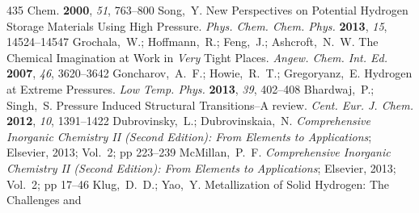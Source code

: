\documentclass[12pt,letterpaper,oneside]{article}
\begin{document}
\begin{mcitethebibliography}{435}
{  Chem.} \textbf{2000}, \emph{51}, 763--800\relax
\mciteBstWouldAddEndPuncttrue
\mciteSetBstMidEndSepPunct{\mcitedefaultmidpunct}
{\mcitedefaultendpunct}{\mcitedefaultseppunct}\relax
\EndOfBibitem
{}
Song,~Y. New Perspectives on Potential Hydrogen Storage Materials Using High
  Pressure. \emph{Phys. Chem. Chem. Phys.} \textbf{2013}, \emph{15},
  14524--14547\relax
\mciteBstWouldAddEndPuncttrue
\mciteSetBstMidEndSepPunct{\mcitedefaultmidpunct}
{\mcitedefaultendpunct}{\mcitedefaultseppunct}\relax
\EndOfBibitem
{}
Grochala,~W.; Hoffmann,~R.; Feng,~J.; Ashcroft,~N.~W. The Chemical Imagination
  at Work in \emph{Very} Tight Places. \emph{Angew. Chem. Int. Ed.}
  \textbf{2007}, \emph{46}, 3620--3642\relax
\mciteBstWouldAddEndPuncttrue
\mciteSetBstMidEndSepPunct{\mcitedefaultmidpunct}
{\mcitedefaultendpunct}{\mcitedefaultseppunct}\relax
\EndOfBibitem
{}
Goncharov,~A.~F.; Howie,~R.~T.; Gregoryanz,~E. Hydrogen at Extreme Pressures.
  \emph{Low Temp. Phys.} \textbf{2013}, \emph{39}, 402--408\relax
\mciteBstWouldAddEndPuncttrue
\mciteSetBstMidEndSepPunct{\mcitedefaultmidpunct}
{\mcitedefaultendpunct}{\mcitedefaultseppunct}\relax
\EndOfBibitem
{}
Bhardwaj,~P.; Singh,~S. Pressure Induced Structural Transitions--A review.
  \emph{Cent. Eur. J. Chem.} \textbf{2012}, \emph{10}, 1391--1422\relax
\mciteBstWouldAddEndPuncttrue
\mciteSetBstMidEndSepPunct{\mcitedefaultmidpunct}
{\mcitedefaultendpunct}{\mcitedefaultseppunct}\relax
\EndOfBibitem
{}
Dubrovinsky,~L.; Dubrovinskaia,~N. \emph{Comprehensive Inorganic Chemistry II
  (Second Edition): From Elements to Applications}; Elsevier, 2013; Vol.~2; pp
  223--239\relax
\mciteBstWouldAddEndPuncttrue
\mciteSetBstMidEndSepPunct{\mcitedefaultmidpunct}
{\mcitedefaultendpunct}{\mcitedefaultseppunct}\relax
\EndOfBibitem
{}
McMillan,~P.~F. \emph{Comprehensive Inorganic Chemistry II (Second Edition):
  From Elements to Applications}; Elsevier, 2013; Vol.~2; pp 17--46\relax
\mciteBstWouldAddEndPuncttrue
\mciteSetBstMidEndSepPunct{\mcitedefaultmidpunct}
{\mcitedefaultendpunct}{\mcitedefaultseppunct}\relax
\EndOfBibitem
{}
Klug,~D.~D.; Yao,~Y. Metallization of Solid Hydrogen: The Challenges and

\end{mcitethebibliography}
\end{document}
